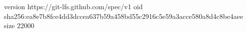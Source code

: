 version https://git-lfs.github.com/spec/v1
oid sha256:ea8e7b8fce4dd3dccea637b59a458bd55c2916c5e59a3acce580a8d4c8be4aee
size 22000
